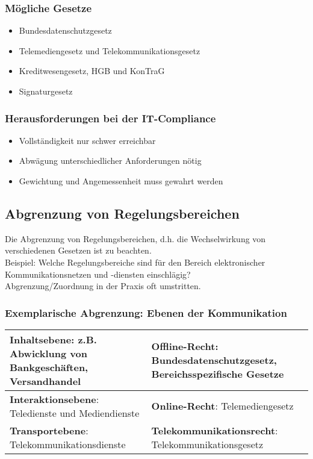 \subsubsection{Mögliche Gesetze}
\begin{itemize}
	\item Bundesdatenschutzgesetz
	\item Telemediengesetz und Telekommunikationsgesetz
	\item Kreditwesengesetz, HGB und KonTraG
	\item Signaturgesetz
\end{itemize}

\subsubsection{Herausforderungen bei der IT-Compliance}
\begin{itemize}
	\item Vollständigkeit nur schwer erreichbar
	\item Abwägung unterschiedlicher Anforderungen nötig
	\item Gewichtung und Angemessenheit muss gewahrt werden
\end{itemize}

\subsection{Abgrenzung von Regelungsbereichen}
Die Abgrenzung von Regelungsbereichen, d.h. die Wechselwirkung von verschiedenen Gesetzen ist zu beachten.\\
Beispiel: Welche Regelungsbereiche sind für den Bereich elektronischer Kommunikationsnetzen und -diensten einschlägig?\\
Abgrenzung/Zuordnung in der Praxis oft umstritten.\\

\subsubsection{Exemplarische Abgrenzung: Ebenen der Kommunikation}

\begin{tabularx}{\columnwidth}{|X|X|l}
	\hline
	\textbf{Inhaltsebene}: z.B. Abwicklung von Bankgeschäften, Versandhandel & \textbf{Offline-Recht}: Bundesdatenschutzgesetz, Bereichsspezifische Gesetze \\
	\hline
	\textbf{Interaktionsebene}: Teledienste und Mediendienste & \textbf{Online-Recht}: Telemediengesetz \\
	\hline
	\textbf{Transportebene}: Telekommunikationsdienste & \textbf{Telekommunikationsrecht}: Telekommunikationsgesetz \\
	\hline
\end{tabularx}

